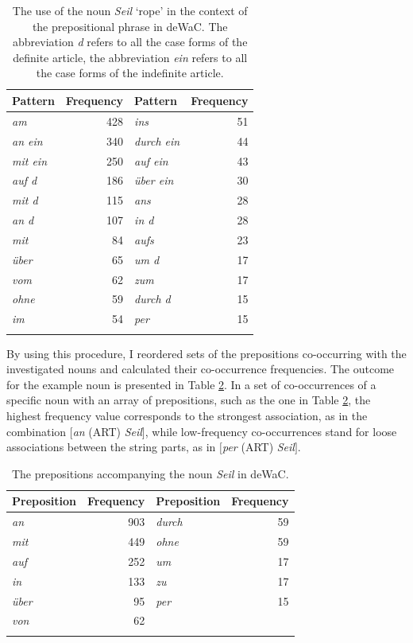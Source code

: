 \begin{table}
		\begin{tabular}{lr lr}
		\lsptoprule
		Pattern & Frequency &  Pattern & Frequency\\\midrule
			\textit{am} & 428 & \textit{ins} & 51\\
			\textit{an ein} & 340 & \textit{durch ein} & 44\\
			\textit{mit ein} & 250 & \textit{auf ein} & 43\\
			\textit{auf d} & 186 & \textit{über ein} & 30\\
			\textit{mit d} & 115 & \textit{ans} & 28\\
			\textit{an d} & 107 & \textit{in d} & 28\\
			\textit{mit} & 84 & \textit{aufs} & 23\\
			\textit{über} & 65 & \textit{um d} & 17\\
			\textit{vom} & 62 & \textit{zum} & 17\\
			\textit{ohne} & 59 & \textit{durch d} & 15\\
			\textit{im} & 54 & \textit{per} & 15\\
		\lspbottomrule
	\end{tabular}
	\caption{The use of the noun \textit{Seil} `rope' in the context of the prepositional phrase in deWaC. The abbreviation \textit{d} refers to all the case forms of the definite article, the abbreviation \textit{ein} refers to all the case forms of the indefinite article.\label{tab:5:2}}
\end{table}

By using this procedure, I reordered sets of the prepositions co-occurring with the investigated nouns and calculated their co-occurrence frequencies. The outcome for the example noun is presented in Table \ref{tab:5:3}. In a set of co-occurrences of a specific noun with an array of prepositions, such as the one in Table \ref{tab:5:3}, the highest frequency value corresponds to the strongest association, as in the combination $[$\textit{an} (ART) \textit{Seil}$]$, while low-frequency co-occurrences stand for loose associations between the string parts, as in $[$\textit{per} (ART) \textit{Seil}$]$.

\begin{table}
		\begin{tabular}{lr lr}
		\lsptoprule
		Preposition & Frequency & Preposition & Frequency\\\midrule
	\textit{an} & 903 & \textit{durch} & 59\\
	\textit{mit} & 449 & \textit{ohne} & 59\\
	\textit{auf} & 252 & \textit{um} & 17\\
	\textit{in} & 133 & \textit{zu} & 17\\
	\textit{über} & 95 & \textit{per} & 15\\
	\textit{von} & 62 & & \\
		\lspbottomrule
	\end{tabular}
	\caption{The prepositions accompanying the noun \textit{Seil} in deWaC.\label{tab:5:3}}
\end{table}

